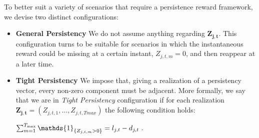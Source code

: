 To better suit a variety of scenarios that require a persistence reward framework, we devise two distinct configurations:
\begin{itemize}
	\item \textbf{General Persistency} We do not assume anything regarding $\boldsymbol{Z_{j,t}}$. This configuration turns to be suitable for scenarios in which the instantaneous reward could be missing at a certain instant, $Z_{j,t,m} =0$, and then reappear at a later time. 
	
	\item \textbf{Tight Persistency} We impose that, giving a realization of a persistency vector, every non-zero component must be adjacent. More formally, we say that we are in \emph{Tight Persistency} configuration if for each realization $\boldsymbol{Z_{j,t}}= (Z_{j,t,1},\dots, Z_{j,t,Tmax})$ the following condition holds:
	
	\begin{center}
		
		$\sum_{m=1}^{\Tmax}\mathds{1}_{\{Z_{j,t,m}>0\}} = l_{j,t}-d_{j,t} \ .$

	
	\end{center}
\end{itemize}







